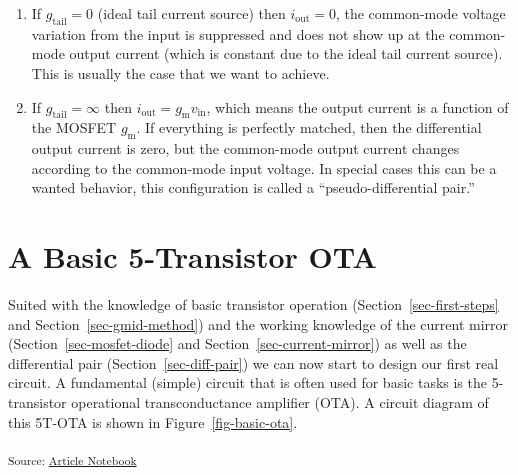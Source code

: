 \documentclass[
  a4paper,
  DIV=11,
  numbers=noendperiod]{scrartcl}
\providecommand{\tightlist}{%
  \setlength{\itemsep}{0pt}\setlength{\parskip}{0pt}}\usepackage{longtable,booktabs,array}
\begin{document}
\begin{enumerate}
\def\labelenumi{\arabic{enumi}.}
\tightlist
\item
  If \(g_\mathrm{tail} = 0\) (ideal tail current source) then
  \(i_\mathrm{out} = 0\), the common-mode voltage variation from the
  input is suppressed and does not show up at the common-mode output
  current (which is constant due to the ideal tail current source). This
  is usually the case that we want to achieve.
\item
  If \(g_\mathrm{tail} = \infty\) then
  \(i_\mathrm{out} = g_\mathrm{m}v_\mathrm{in}\), which means the output
  current is a function of the MOSFET \(g_\mathrm{m}\). If everything is
  perfectly matched, then the differential output current is zero, but
  the common-mode output current changes according to the common-mode
  input voltage. In special cases this can be a wanted behavior, this
  configuration is called a ``pseudo-differential pair.''
\end{enumerate}

\section{A Basic 5-Transistor OTA}\label{sec-basic-ota}

Suited with the knowledge of basic transistor operation
(Section~\ref{sec-first-steps} and Section~\ref{sec-gmid-method}) and
the working knowledge of the current mirror
(Section~\ref{sec-mosfet-diode} and Section~\ref{sec-current-mirror}) as
well as the differential pair (Section~\ref{sec-diff-pair}) we can now
start to design our first real circuit. A fundamental (simple) circuit
that is often used for basic tasks is the 5-transistor operational
transconductance amplifier (OTA). A circuit diagram of this 5T-OTA is
shown in Figure~\ref{fig-basic-ota}.

\textsubscript{Source:
\href{https://iic-jku.github.io/analog-circuit-design/index.qmd.html}{Article
Notebook}}
\end{document}
